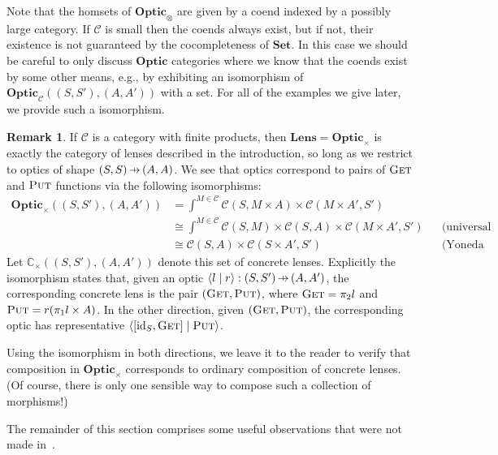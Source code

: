 \documentclass[11pt,letterpaper]{article}
\theoremstyle{plain}
\theoremstyle{definition}
\newtheorem{remark}[theorem]{Remark}
\newcommand{\C}{\mathscr{C}}
\newcommand{\Set}{\mathbf{Set}}
\newcommand{\Optic}{\mathbf{Optic}}
\newcommand{\Lens}{\mathbf{Lens}}
\newcommand{\conc}{\mathbb{C}}
\newcommand{\id}{\mathrm{id}}
\newcommand{\rep}[2]{{\ensuremath \left\langle #1 \mid #2 \right\rangle}}
\newcommand{\fget}{\textsc{Get}}
\newcommand{\fput}{\textsc{Put}}
\newcommand{\hto}{\ensuremath{\,\mathaccent\shortmid\rightarrow\,}}
\begin{document}
  Note that the homsets of $\Optic_\otimes$ are given by a coend indexed by a possibly large category. If $\C$ is small then the coends always exist, but if not, their existence is not guaranteed by the cocompleteness of $\Set$. In this case we should be careful to only discuss $\Optic$ categories where we know that the coends exist by some other means, e.g., by exhibiting an isomorphism of $\Optic_\C((S, S'), (A, A'))$ with a set. For all of the examples we give later, we provide such a isomorphism.

\begin{remark}
If $\C$ is a category with finite products, then $\Lens = \Optic_\times$ is exactly the category of lenses described in the introduction, so long as we restrict to optics of shape $(S, S) \hto (A, A)$. We see that optics correspond to pairs of $\fget$ and $\fput$ functions via the following isomorphisms:
\begin{align*}
  \Optic_\times((S, S'), (A, A')) 
  &= \int^{M \in \C} \C(S, M \times A) \times \C(M \times A', S') \\
  &\cong \int^{M \in \C} \C(S, M) \times \C(S, A) \times \C(M \times A', S') && \text{(universal property of product)} \\
  &\cong \C(S, A) \times \C(S \times A', S') && \text{(Yoneda reduction)}
\end{align*}
Let $\conc_\times((S, S'), (A, A'))$ denote this set of concrete lenses. Explicitly the isomorphism states that, given an optic $\rep{l}{r} : (S, S') \hto (A, A')$, the corresponding concrete lens is the pair $(\fget, \fput)$, where $\fget = \pi_2 l$ and $\fput = r (\pi_1 l \times A)$. In the other direction, given $(\fget, \fput)$, the corresponding optic has representative $\rep{[\id_S, \fget]}{\fput}$.

Using the isomorphism in both directions, we leave it to the reader to verify that composition in $\Optic_\times$ corresponds to ordinary composition of concrete lenses. (Of course, there is only one sensible way to compose such a collection of morphisms!)
\end{remark}

The remainder of this section comprises some useful observations that were not made in~\cite{Doubles}.
\end{document}
